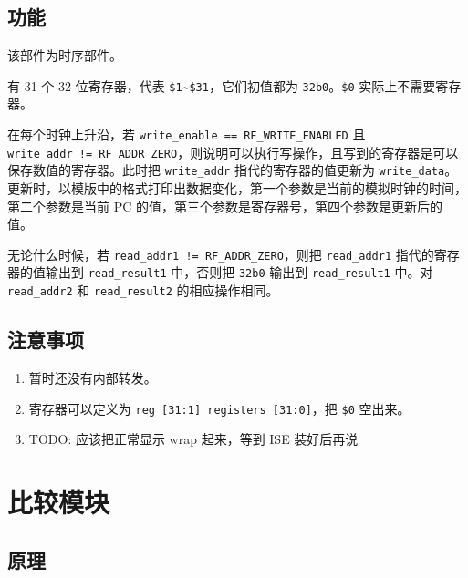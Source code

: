 \documentclass[12pt,AutoFakeBold,AutoFakeSlant]{article}
\providecommand{\tightlist}{%
  \setlength{\itemsep}{0pt}\setlength{\parskip}{0pt}}
\begin{document}
\hypertarget{ux529fux80fd-3}{%
\subsection{功能}\label{ux529fux80fd-3}}

该部件为时序部件。

有 31 个 32 位寄存器，代表
\texttt{\$1}\textasciitilde{}\texttt{\$31}，它们初值都为
\texttt{32\textquotesingle{}b0}。\texttt{\$0} 实际上不需要寄存器。

在每个时钟上升沿，若 \texttt{write\_enable\ ==\ RF\_WRITE\_ENABLED} 且
\texttt{write\_addr\ !=\ RF\_ADDR\_ZERO}，则说明可以执行写操作，且写到的寄存器是可以保存数值的寄存器。此时把
\texttt{write\_addr} 指代的寄存器的值更新为
\texttt{write\_data}。更新时，以模版中的格式打印出数据变化，第一个参数是当前的模拟时钟的时间，第二个参数是当前
PC 的值，第三个参数是寄存器号，第四个参数是更新后的值。

无论什么时候，若 \texttt{read\_addr1\ !=\ RF\_ADDR\_ZERO}，则把
\texttt{read\_addr1} 指代的寄存器的值输出到 \texttt{read\_result1}
中，否则把 \texttt{32\textquotesingle{}b0} 输出到 \texttt{read\_result1}
中。对 \texttt{read\_addr2} 和 \texttt{read\_result2} 的相应操作相同。

\hypertarget{ux6ce8ux610fux4e8bux9879-3}{%
\subsection{注意事项}\label{ux6ce8ux610fux4e8bux9879-3}}

\begin{enumerate}
\def\labelenumi{\arabic{enumi}.}
\tightlist
\item
  暂时还没有内部转发。
\item
  寄存器可以定义为 \texttt{reg\ {[}31:1{]}\ registers\ {[}31:0{]}}，把
  \texttt{\$0} 空出来。
\item
  TODO: 应该把正常显示 wrap 起来，等到 ISE 装好后再说
\end{enumerate}

\hypertarget{ux6bd4ux8f83ux6a21ux5757}{%
\section{比较模块}\label{ux6bd4ux8f83ux6a21ux5757}}

\hypertarget{ux539fux7406-4}{%
\subsection{原理}\label{ux539fux7406-4}}
\end{document}

